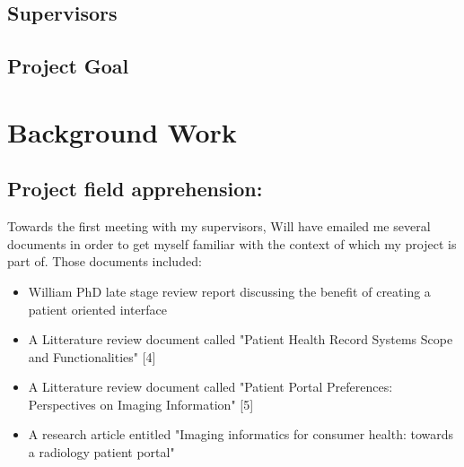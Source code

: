 \documentclass[12pt,twoside]{article}
\begin{document}
\subsection{Supervisors}




\subsection{Project Goal}




\clearpage
\section{Background Work}


\subsection{Project field apprehension:} 
Towards the first meeting with my supervisors, Will have emailed me several documents in order to get myself familiar with the context of which my project is part of.
Those documents included:
\begin{itemize}
\item William PhD late stage review report discussing the benefit of creating a patient oriented interface
\item A Litterature review document called "Patient Health Record Systems Scope and Functionalities" [4]
\item A Litterature review document called "Patient Portal Preferences: Perspectives on Imaging Information" [5]
\item A research article entitled "Imaging informatics for consumer health: towards a radiology patient portal"
\end{itemize}
 
\end{document}
